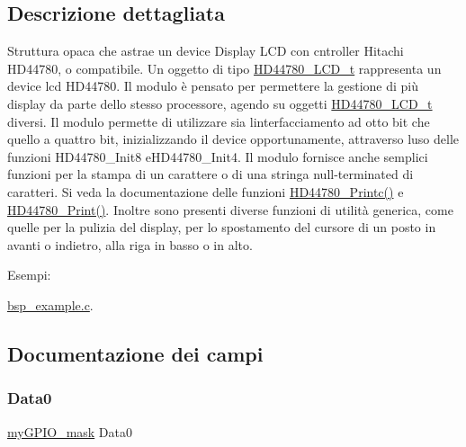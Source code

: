 \subsection{Descrizione dettagliata}
Struttura opaca che astrae un device Display L\+CD con cntroller Hitachi H\+D44780, o compatibile. Un oggetto di tipo \hyperlink{struct_h_d44780___l_c_d__t}{H\+D44780\+\_\+\+L\+C\+D\+\_\+t} rappresenta un device lcd H\+D44780. Il modulo è pensato per permettere la gestione di più display da parte dello stesso processore, agendo su oggetti \hyperlink{struct_h_d44780___l_c_d__t}{H\+D44780\+\_\+\+L\+C\+D\+\_\+t} diversi. Il modulo permette di utilizzare sia l\textquotesingle{}interfacciamento ad otto bit che quello a quattro bit, inizializzando il device opportunamente, attraverso l\textquotesingle{}uso delle funzioni H\+D44780\+\_\+\+Init8 e\+H\+D44780\+\_\+\+Init4. Il modulo fornisce anche semplici funzioni per la stampa di un carattere o di una stringa null-\/terminated di caratteri. Si veda la documentazione delle funzioni \hyperlink{group___h_d44780_ga57b8c6ca0b3c12e5f7273b3c373a6f17}{H\+D44780\+\_\+\+Printc()} e \hyperlink{group___h_d44780_ga3aedff8e2040e62db569fde955d3987b}{H\+D44780\+\_\+\+Print()}. Inoltre sono presenti diverse funzioni di utilità generica, come quelle per la pulizia del display, per lo spostamento del cursore di un posto in avanti o indietro, alla riga in basso o in alto. \begin{Desc}
\item[Esempi\+: ]\par
\hyperlink{bsp_example_8c-example}{bsp\+\_\+example.\+c}.\end{Desc}


\subsection{Documentazione dei campi}
\mbox{\label{struct_h_d44780___l_c_d__t_a1f035dad73cbfdf86503edc70141696b}} 
\subsubsection{\texorpdfstring{Data0}{Data0}}
{\footnotesize\ttfamily \hyperlink{group__bare-metal_ga402a0d20afc0cb7c25554b8b023f4253}{my\+G\+P\+I\+O\+\_\+mask} Data0}

